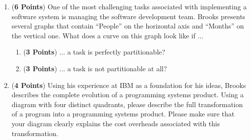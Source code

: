 \documentclass[12pt,epsf,psfig,graphics]{article}
\begin{document}
\begin{enumerate}
\begin{enumerate}
  \item ({\bf 6 Points}) One of the most challenging tasks associated
    with implementing a software system is managing the software
    development team.  Brooks presents several graphs that contain
    ``People'' on the horizontal axis and ``Months'' on the vertical
    one.  What does a curve on this graph look like if $\ldots$

    \begin{enumerate}

      \item ({\bf 3 Points}) $\ldots$ a task is perfectly partitionable?
    
      \item ({\bf 3 Points}) $\ldots$ a task is not partitionable at all?

    \end{enumerate}

  \item ({\bf 4 Points}) Using his experience at IBM as a foundation
    for his ideas, Brooks describes the complete evolution of a
    programming systems product.  Using a diagram with four distinct
    quadrants, please describe the full transformation of a program
    into a programming systems product.  Please make sure that your
    diagram clearly explains the cost overheads associated with this
    transformation.

  \end{enumerate}
 

\end{enumerate}
\end{document}
